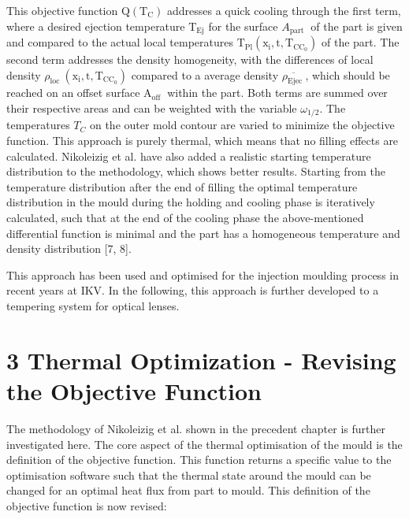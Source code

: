 \documentclass[10pt]{article}
\begin{document}
This objective function $\mathrm{Q}\left(\mathrm{T}_{\mathrm{C}}\right)$ addresses a quick cooling through the first term, where a desired ejection temperature $\mathrm{T}_{\mathrm{Ej}}$ for the surface $A_{\text {part }}$ of the part is given and compared to the actual local temperatures $\mathrm{T}_{\mathrm{Pl}}\left(\mathrm{x}_{\mathrm{i}}, \mathrm{t}, \mathrm{T}_{\mathrm{CC}_{0}}\right)$ of the part. The second term addresses the density homogeneity, with the differences of local density $\rho_{\text {loc }}\left(\mathrm{x}_{\mathrm{i}}, \mathrm{t}, \mathrm{T}_{\mathrm{CC}_{0}}\right)$ compared to a average density $\overline{\rho_{\text {Ejec }}}$, which should be reached on an offset surface $\mathrm{A}_{\text {off }}$ within the part. Both terms are summed over their respective areas and can be weighted with the variable $\omega_{1 / 2}$. The temperatures $T_{C}$ on the outer mold contour are varied to minimize the objective function. This approach is purely thermal, which means that no filling effects are calculated. Nikoleizig et al. have also added a realistic starting temperature distribution to the methodology, which shows better results. Starting from the temperature distribution after the end of filling the optimal temperature distribution in the mould during the holding and cooling phase is iteratively calculated, such that at the end of the cooling phase the above-mentioned differential function is minimal and the part has a homogeneous temperature and density distribution [7, 8].

This approach has been used and optimised for the injection moulding process in recent years at IKV. In the following, this approach is further developed to a tempering system for optical lenses.

\section*{3 Thermal Optimization - Revising the Objective Function}
The methodology of Nikoleizig et al. shown in the precedent chapter is further investigated here. The core aspect of the thermal optimisation of the mould is the definition of the objective function. This function returns a specific value to the optimisation software such that the thermal state around the mould can be changed for an optimal heat flux from part to mould. This definition of the objective function is now revised:
\end{document}

